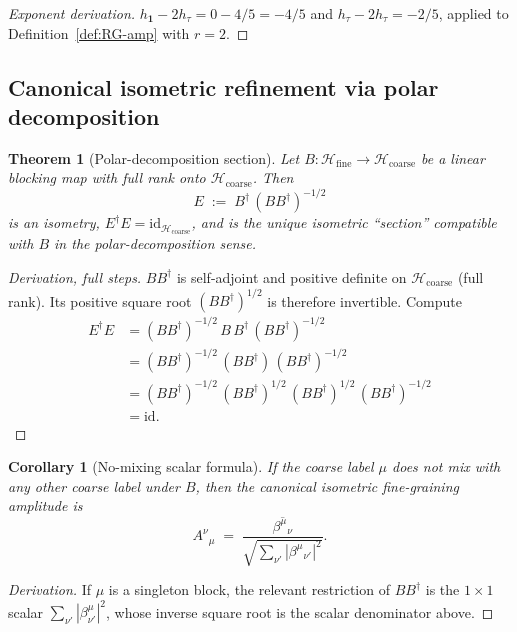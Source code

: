 \documentclass[11pt,a4paper]{article}
\newtheorem{theorem}[definition]{Theorem}
\newtheorem{corollary}[definition]{Corollary}
\theoremstyle{definition}
\newcommand{\Hh}{\mathcal{H}}
\newcommand{\id}{\mathrm{id}}
\newcommand{\one}{\mathbf{1}}
\begin{document}
\begin{proof}[Exponent derivation]
$h_\one - 2h_\tau = 0 - 4/5 = -4/5$ and $h_\tau - 2h_\tau = -2/5$, applied
to Definition~\ref{def:RG-amp} with $r=2$.
\end{proof}

\subsection{Canonical isometric refinement via polar decomposition}

\begin{theorem}[Polar-decomposition section]\label{thm:polar}
Let $B:\Hh_{\mathrm{fine}}\to\Hh_{\mathrm{coarse}}$ be a linear blocking
map with full rank onto $\Hh_{\mathrm{coarse}}$. Then
\[
E \;:=\; B^{\dagger}\,(B B^{\dagger})^{-1/2}
\]
is an isometry, $E^{\dagger}E = \id_{\Hh_{\mathrm{coarse}}}$, and is the
unique isometric ``section'' compatible with $B$ in the polar-decomposition
sense.
\end{theorem}

\begin{proof}[Derivation, full steps]
$BB^{\dagger}$ is self-adjoint and positive definite on
$\Hh_{\mathrm{coarse}}$ (full rank). Its positive square root
$(BB^{\dagger})^{1/2}$ is therefore invertible. Compute
\begin{align*}
E^{\dagger}E
&= (BB^{\dagger})^{-1/2}\,B\,B^{\dagger}\,(BB^{\dagger})^{-1/2}\\
&= (BB^{\dagger})^{-1/2}\,(BB^{\dagger})\,(BB^{\dagger})^{-1/2}\\
&= (BB^{\dagger})^{-1/2}\,(BB^{\dagger})^{1/2}\,(BB^{\dagger})^{1/2}\,(BB^{\dagger})^{-1/2}\\
&= \id.
\end{align*}
\end{proof}

\begin{corollary}[No-mixing scalar formula]\label{cor:nomix}
If the coarse label $\mu$ does not mix with any other coarse label under
$B$, then the canonical isometric fine-graining amplitude is
\[
A^{\nu}{}_{\mu} \;=\; \frac{\overline{\beta^{\mu}{}_{\nu}}}{\sqrt{\sum_{\nu'} |\beta^{\mu}{}_{\nu'}|^{2}}}.
\]
\end{corollary}

\begin{proof}[Derivation]
If $\mu$ is a singleton block, the relevant restriction of $BB^{\dagger}$
is the $1\times 1$ scalar $\sum_{\nu'}|\beta^{\mu}_{\nu'}|^{2}$, whose
inverse square root is the scalar denominator above.
\end{proof}
\end{document}
